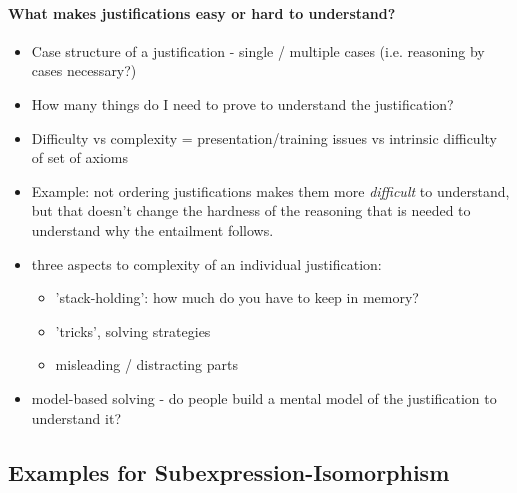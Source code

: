 \paragraph*{What makes justifications easy or hard to understand?}
\begin{itemize}
\item Case structure of a justification - single / multiple cases (i.e. reasoning by cases necessary?)
\item How many things do I need to prove to understand the justification?
\item Difficulty vs complexity = presentation/training issues vs intrinsic difficulty of set of axioms\
\item Example: not ordering justifications makes them more \emph{difficult} to understand, but that doesn't change the hardness of the reasoning that is needed to understand why the entailment follows.
\item three aspects to complexity of an individual justification:
\begin{itemize}
\item 'stack-holding': how much do you have to keep in memory?
\item 'tricks', solving strategies
\item misleading / distracting parts
\end{itemize}
\item model-based solving - do people build a mental model of the justification to understand it?
\end{itemize}



\subsection*{Examples for Subexpression-Isomorphism}

